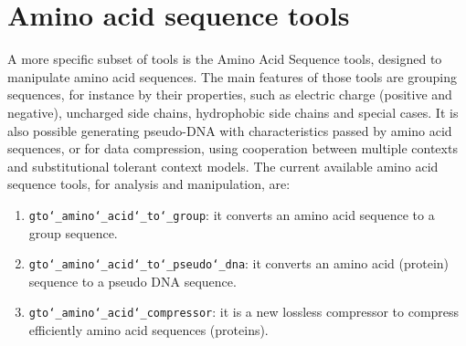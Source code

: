 \chapter{Amino acid sequence tools}
\label{seq}
A more specific subset of tools is the Amino Acid Sequence tools, designed to manipulate amino acid sequences. The main features of those tools are grouping sequences, for instance by their properties, such as electric charge (positive and negative), uncharged side chains, hydrophobic side chains and special cases. It is also possible generating pseudo-DNA with characteristics passed by amino acid sequences, or for data compression, using cooperation between multiple contexts and substitutional tolerant context models. The current available amino acid sequence tools, for analysis and manipulation, are:
\begin{enumerate}
	
\item \texttt{gto\char`_amino\char`_acid\char`_to\char`_group}: it converts an amino acid sequence to a group sequence.

\item \texttt{gto\char`_amino\char`_acid\char`_to\char`_pseudo\char`_dna}: it converts an amino acid (protein) sequence to a pseudo DNA sequence.

\item \texttt{gto\char`_amino\char`_acid\char`_compressor}: it is a new lossless compressor to compress efficiently amino acid sequences (proteins).

\end{enumerate}




